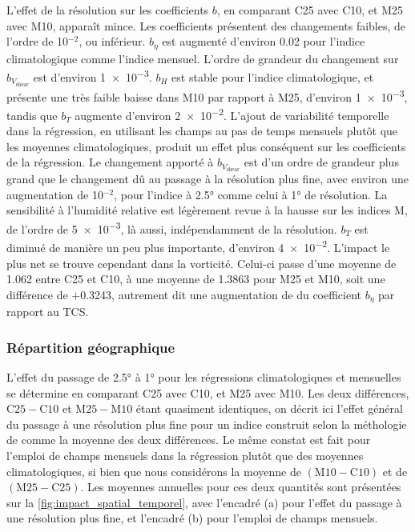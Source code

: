 \documentclass[../main.tex]{subfiles}
\begin{document}
L'effet de la résolution sur les coefficients $b$, en comparant C25 avec C10, et M25 avec M10, apparaît mince. Les coefficients présentent des changements
faibles, de l'ordre de \num{10}$^{\num{-2}}$, ou inférieur. $b_{\eta}$ est augmenté d'environ \num{0.02} pour l'indice climatologique comme l'indice mensuel.
L'ordre de grandeur du changement sur $b_{V_{\mathrm{shear}}}$ est d'environ \num{1e-3}. $b_H$ est stable pour l'indice climatologique, et présente une très
faible baisse dans M10 par rapport à M25, d'environ \num{1e-3}, tandis que $b_T$ augmente d'environ \num{2e-2}. L'ajout de variabilité temporelle dans la
régression, en utilisant les champs au pas de temps mensuels plutôt que les moyennes climatologiques, produit un effet plus conséquent sur les coefficients de
la régression. Le changement apporté à $b_{V_{\mathrm{shear}}}$ est d'un ordre de grandeur plus grand que le changement dû au passage à la résolution plus fine,
avec environ une augmentation de \num{10}$^{\num{-2}}$, pour l'indice à \ang{2.5} comme celui à \ang{1} de résolution. La sensibilité à l'humidité relative est
légèrement revue à la hausse sur les indices M, de l'ordre de \num{5e-3}, là aussi, indépendamment de la résolution. $b_T$ est diminué de manière un peu plus
importante, d'environ \num{4e-2}. L'impact le plus net se trouve cependant dans la vorticité. Celui-ci passe d'une moyenne de \num{1.062} entre C25 et C10, à
une moyenne de \num{1.3863} pour M25 et M10, soit une différence de $+$\num{0.3243}, autrement dit une augmentation de  du coefficient $b_{\eta}$ par
rapport au TCS.

\subsubsection{Répartition géographique}\label{sec:repartition_geographique}

L'effet du passage de \ang{2.5} à \ang{1} pour les régressions climatologiques et mensuelles se détermine en comparant C25 avec C10, et M25 avec M10. Les deux
différences, $\mathrm{C25} - \mathrm{C10}$ et $\mathrm{M25} - \mathrm{M10}$ étant quasiment identiques, on décrit ici l'effet général du passage à une
résolution plus fine pour un indice construit selon la méthologie de \textcite{tippett_poisson_2011} comme la moyenne des deux différences. Le même constat est
fait pour l'emploi de champs mensuels dans la régression plutôt que des moyennes climatologiques, si bien que nous considérons la moyenne de $(\mathrm{M10} -
\mathrm{C10})$ et de $(\mathrm{M25} - \mathrm{C25})$. Les moyennes annuelles pour ces deux quantités sont présentées sur la \cref{fig:impact_spatial_temporel},
avec l'encadré (a) pour l'effet du passage à une résolution plus fine, et l'encadré (b) pour l'emploi de champs mensuels.
\end{document}
